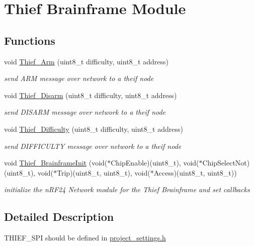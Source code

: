 \hypertarget{group__thief__brainframe}{}\section{Thief Brainframe Module}
\label{group__thief__brainframe}
\subsection*{Functions}
\begin{DoxyCompactItemize}
\item 
void \mbox{\hyperlink{group__thief__brainframe_gaf4b9fbc4453a50a19a28ecee8ed63044}{Thief\+\_\+\+Arm}} (uint8\+\_\+t difficulty, uint8\+\_\+t address)
\begin{DoxyCompactList}\small\item\em send A\+RM message over network to a theif node \end{DoxyCompactList}\item 
void \mbox{\hyperlink{group__thief__brainframe_ga10cdfb092b86745f7fb0b3531e0436ab}{Thief\+\_\+\+Disarm}} (uint8\+\_\+t difficulty, uint8\+\_\+t address)
\begin{DoxyCompactList}\small\item\em send D\+I\+S\+A\+RM message over network to a theif node \end{DoxyCompactList}\item 
void \mbox{\hyperlink{group__thief__brainframe_ga7ca7cde9d8471a5e774b9259dcc15482}{Thief\+\_\+\+Difficulty}} (uint8\+\_\+t difficulty, uint8\+\_\+t address)
\begin{DoxyCompactList}\small\item\em send D\+I\+F\+F\+I\+C\+U\+L\+TY message over network to a theif node \end{DoxyCompactList}\item 
void \mbox{\hyperlink{group__thief__brainframe_ga9a9be1f1330ceab71417b4f6896c6596}{Thief\+\_\+\+Brainframe\+Init}} (void($\ast$Chip\+Enable)(uint8\+\_\+t), void($\ast$Chip\+Select\+Not)(uint8\+\_\+t), void($\ast$Trip)(uint8\+\_\+t, uint8\+\_\+t), void($\ast$Access)(uint8\+\_\+t, uint8\+\_\+t))
\begin{DoxyCompactList}\small\item\em initialize the n\+R\+F24 Network module for the Thief Brainframe and set callbacks \end{DoxyCompactList}\end{DoxyCompactItemize}


\subsection{Detailed Description}
T\+H\+I\+E\+F\+\_\+\+S\+PI should be defined in \mbox{\hyperlink{project__settings_8h}{project\+\_\+settings.\+h}}

